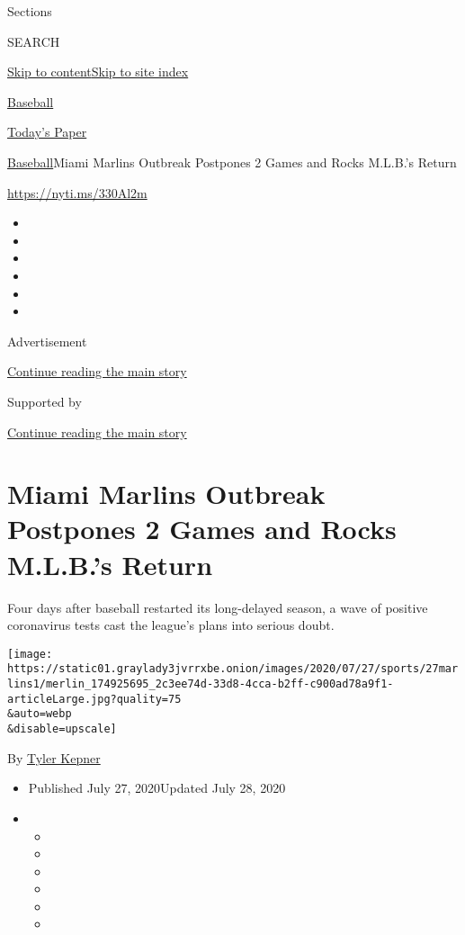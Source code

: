 Sections

SEARCH

\protect\hyperlink{site-content}{Skip to
content}\protect\hyperlink{site-index}{Skip to site index}

\href{https://www.nytimes3xbfgragh.onion/section/sports/baseball}{Baseball}

\href{https://myaccount.nytimes3xbfgragh.onion/auth/login?response_type=cookie\&client_id=vi}{}

\href{https://www.nytimes3xbfgragh.onion/section/todayspaper}{Today's
Paper}

\href{/section/sports/baseball}{Baseball}\textbar{}Miami Marlins
Outbreak Postpones 2 Games and Rocks M.L.B.'s Return

\url{https://nyti.ms/330Al2m}

\begin{itemize}
\item
\item
\item
\item
\item
\item
\end{itemize}

Advertisement

\protect\hyperlink{after-top}{Continue reading the main story}

Supported by

\protect\hyperlink{after-sponsor}{Continue reading the main story}

\hypertarget{miami-marlins-outbreak-postpones-2-games-and-rocks-mlbs-return}{%
\section{Miami Marlins Outbreak Postpones 2 Games and Rocks M.L.B.'s
Return}\label{miami-marlins-outbreak-postpones-2-games-and-rocks-mlbs-return}}

Four days after baseball restarted its long-delayed season, a wave of
positive coronavirus tests cast the league's plans into serious doubt.

\texttt{[image: https://static01.graylady3jvrrxbe.onion/images/2020/07/27/sports/27marlins1/merlin\_174925695\_2c3ee74d-33d8-4cca-b2ff-c900ad78a9f1-articleLarge.jpg?quality=75\\\&auto=webp\\\&disable=upscale]}

By \href{https://www.nytimes3xbfgragh.onion/by/tyler-kepner}{Tyler
Kepner}

\begin{itemize}
\item
  Published July 27, 2020Updated July 28, 2020
\item
  \begin{itemize}
  \item
  \item
  \item
  \item
  \item
  \item
  \end{itemize}
\end{itemize}

